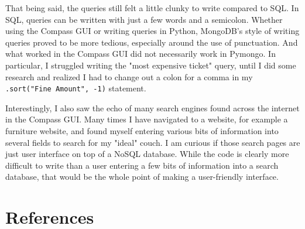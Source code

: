\documentclass[]{article}
\newcommand{\code}[1]{\colorbox{light-gray}{\texttt{#1}}}
\begin{document}
That being said, the queries still felt a little clunky to write compared to SQL.  In SQL, queries can be written with just a few words and a semicolon.  Whether using the Compass GUI or writing queries in Python, MongoDB's style of writing queries proved to be more tedious, especially around the use of punctuation.  And what worked in the Compass GUI did not necessarily work in Pymongo.  In particular, I struggled writing the "most expensive ticket" query, until I did some research and realized I had to change out a colon for a comma in my \code{.sort("Fine Amount", -1)} statement. 

Interestingly, I also saw the echo of many search engines found across the internet in the Compass GUI.  Many times I have navigated to a website, for example a furniture website, and found myself entering various bits of information into several fields to search for my "ideal" couch.  I am curious if those search pages are just user interface on top of a NoSQL database.  While the code is clearly more difficult to write than a user entering a few bits of information into a search database, that would be the whole point of making a user-friendly interface.
\section{References}
\end{document}
